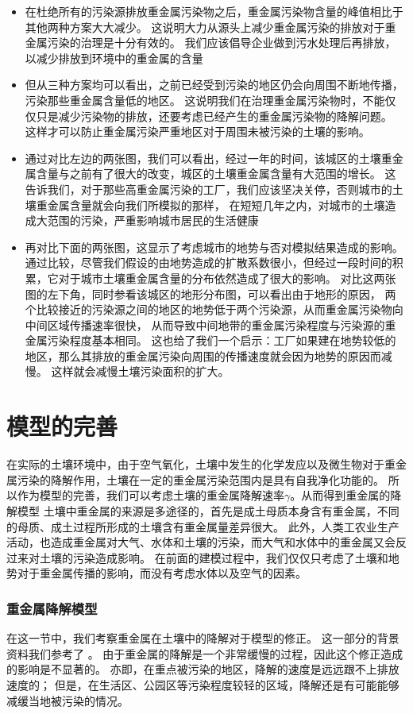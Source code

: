 \documentclass[a4paper]{article}
\begin{document}
\begin{itemize}
\item 在杜绝所有的污染源排放重金属污染物之后，重金属污染物含量的峰值相比于其他两种方案大大减少。
这说明大力从源头上减少重金属污染的排放对于重金属污染的治理是十分有效的。
我们应该倡导企业做到污水处理后再排放，以减少排放到环境中的重金属的含量
\item 但从三种方案均可以看出，之前已经受到污染的地区仍会向周围不断地传播，污染那些重金属含量低的地区。
这说明我们在治理重金属污染物时，不能仅仅只是减少污染物的排放，还要考虑已经产生的重金属污染物的降解问题。
这样才可以防止重金属污染严重地区对于周围未被污染的土壤的影响。
\item 通过对比左边的两张图，我们可以看出，经过一年的时间，该城区的土壤重金属含量与之前有了很大的改变，城区的土壤重金属含量有大范围的增长。
这告诉我们，对于那些高重金属污染的工厂，我们应该坚决关停，否则城市的土壤重金属含量就会向我们所模拟的那样，
在短短几年之内，对城市的土壤造成大范围的污染，严重影响城市居民的生活健康
\item 再对比下面的两张图，这显示了考虑城市的地势与否对模拟结果造成的影响。
通过比较，尽管我们假设的由地势造成的扩散系数很小，但经过一段时间的积累，它对于城市土壤重金属含量的分布依然造成了很大的影响。
对比这两张图的左下角，同时参看该城区的地形分布图，可以看出由于地形的原因，
两个比较接近的污染源之间的地区的地势低于两个污染源，从而重金属污染物向中间区域传播速率很快，
从而导致中间地带的重金属污染程度与污染源的重金属污染程度基本相同。
这也给了我们一个启示：工厂如果建在地势较低的地区，那么其排放的重金属污染向周围的传播速度就会因为地势的原因而减慢。
这样就会减慢土壤污染面积的扩大。
\end{itemize}
\part{模型的完善}
在实际的土壤环境中，由于空气氧化，土壤中发生的化学发应以及微生物对于重金属污染的降解作用，土壤在一定的重金属污染范围内是具有自我净化功能的。
所以作为模型的完善，我们可以考虑土壤的重金属降解速率$\gamma$。从而得到重金属的降解模型
土壤中重金属的来源是多途径的，首先是成土母质本身含有重金属，不同的母质、成土过程所形成的土壤含有重金属量差异很大。
此外，人类工农业生产活动，也造成重金属对大气、水体和土壤的污染，而大气和水体中的重金属又会反过来对土壤的污染造成影响。
在前面的建模过程中，我们仅仅只考虑了土壤和地势对于重金属传播的影响，而没有考虑水体以及空气的因素。
\section{重金属降解模型}
在这一节中，我们考察重金属在土壤中的降解对于模型的修正。
这一部分的背景资料我们参考了 \cite{art:jiangjie} 。
由于重金属的降解是一个非常缓慢的过程，因此这个修正造成的影响是不显著的。
亦即，在重点被污染的地区，降解的速度是远远跟不上排放速度的；
但是，在生活区、公园区等污染程度较轻的区域，降解还是有可能能够减缓当地被污染的情况。
\end{document}
